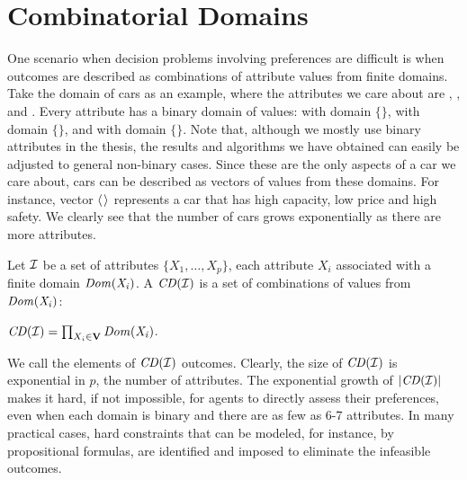 \section{Combinatorial Domains \label{sec:comb_domains}}
One scenario when decision problems involving preferences are difficult is when outcomes
are described as combinations of attribute values from finite domains.
Take the domain of cars as an example, where the attributes we care about are
, , and .
Every attribute has a binary domain of values:
 with domain $\{$$\}$,
 with domain $\{$$\}$, and
 with domain $\{$$\}$.
Note that, although we mostly use binary attributes in the thesis,
the results and algorithms we have obtained can easily be adjusted
to general non-binary cases.
Since these are the only aspects of a car we care about, cars can be
described as vectors of values from these domains.
For instance, vector $\mathit{\langle}$$\mathit{\rangle}$ represents
a car that has high capacity, low price and high safety.
We clearly see that the number of cars grows exponentially as
there are more attributes.

\begin{definition}
	Let $\mathcal{I}$ be a set of attributes $\{X_1,\ldots,X_p\}$, each attribute $X_i$
	associated with a finite domain $\it{Dom}(X_i)$.
	A  $\mathit{CD}(\mathcal{I})$ is a set of 
	combinations of values from $\it{Dom}(X_i)$:
	\begin{center}
		$\mathit{CD}(\mathcal{I}) = \prod_{X_i \in \textbf{V}} \it{Dom}(X_i)$.
	\end{center}
\end{definition}


We call the elements of $\mathit{CD}(\mathcal{I})$ outcomes.
Clearly, the size of $\mathit{CD}(\mathcal{I})$ is exponential in $p$, the number of attributes.
The exponential growth of $|\mathit{CD}(\mathcal{I})|$ makes it hard, if not impossible, for agents
to directly assess their preferences, even when each domain is binary and
there are as few as 6-7 attributes.
In many practical cases, hard constraints that can be modeled, for instance, 
by propositional formulas, are identified and imposed 
to eliminate the infeasible outcomes.



